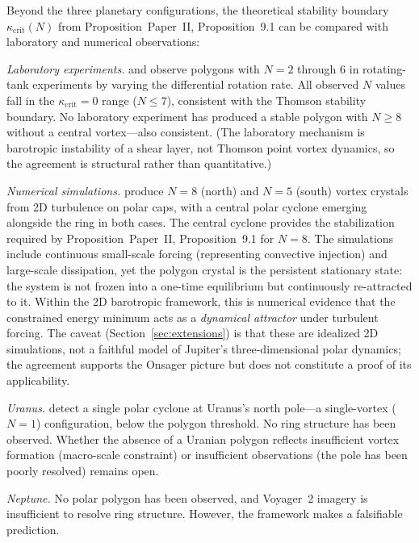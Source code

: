 Beyond the three planetary configurations, the theoretical stability
boundary $\kappa_{\mathrm{crit}}(N)$ from
Proposition~Paper~II, Proposition~9.1 can be compared with laboratory and
numerical observations:

\emph{Laboratory experiments.}  \citet{Jansson2006} and
\citet{BarbosaAguiar2010} observe polygons with $N = 2$ through $6$
in rotating-tank experiments by varying the differential rotation rate.
All observed $N$ values fall in the $\kappa_{\mathrm{crit}} = 0$ range
($N \le 7$), consistent with the Thomson stability boundary.  No
laboratory experiment has produced a stable polygon with $N \ge 8$
without a central vortex---also consistent.  (The laboratory mechanism
is barotropic instability of a shear layer, not Thomson point vortex
dynamics, so the agreement is structural rather than quantitative.)

\emph{Numerical simulations.}  \citet{Siegelman2022} produce $N = 8$
(north) and $N = 5$ (south) vortex crystals from 2D turbulence on polar
caps, with a central polar cyclone emerging alongside the ring in both
cases.  The central cyclone provides the stabilization required by
Proposition~Paper~II, Proposition~9.1 for $N = 8$.
The \citet{Siegelman2022} simulations include continuous small-scale
forcing (representing convective injection) and large-scale dissipation,
yet the polygon crystal is the persistent stationary state: the system
is not frozen into a one-time equilibrium but continuously re-attracted
to it.  Within the 2D barotropic framework, this is numerical evidence
that the constrained energy minimum acts as a \emph{dynamical attractor}
under turbulent forcing.  The caveat (Section~\ref{sec:extensions}) is
that these are idealized 2D simulations, not a faithful model of
Jupiter's three-dimensional polar dynamics; the agreement supports the
Onsager picture but does not constitute a proof of its applicability.

\emph{Uranus.}  \citet{Akins2023} detect a single polar cyclone at
Uranus's north pole---a single-vortex ($N = 1$) configuration, below
the polygon threshold.  No ring structure has been observed.  Whether
the absence of a Uranian polygon reflects insufficient vortex formation
(macro-scale constraint) or insufficient observations (the pole has been
poorly resolved) remains open.

\emph{Neptune.}  No polar polygon has been observed, and Voyager~2
imagery is insufficient to resolve ring structure.  However, the
framework makes a falsifiable prediction.

